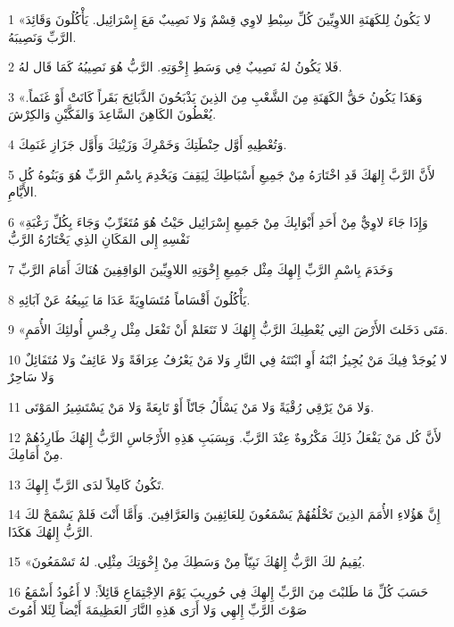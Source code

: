 \par 1 «لا يَكُونُ لِلكَهَنَةِ اللاوِيِّينَ كُلِّ سِبْطِ لاوِي قِسْمٌ وَلا نَصِيبٌ مَعَ إِسْرَائِيل. يَأْكُلُونَ وَقَائِدَ الرَّبِّ وَنَصِيبَهُ.
\par 2 فَلا يَكُونُ لهُ نَصِيبٌ فِي وَسَطِ إِخْوَتِهِ. الرَّبُّ هُوَ نَصِيبُهُ كَمَا قَال لهُ.
\par 3 «وَهَذَا يَكُونُ حَقُّ الكَهَنَةِ مِنَ الشَّعْبِ مِنَ الذِينَ يَذْبَحُونَ الذَّبَائِحَ بَقَراً كَانَتْ أَوْ غَنَماً. يُعْطُونَ الكَاهِنَ السَّاعِدَ وَالفَكَّيْنِ وَالكِرْشَ.
\par 4 وَتُعْطِيهِ أَوَّل حِنْطَتِكَ وَخَمْرِكَ وَزَيْتِكَ وَأَوَّل جَزَازِ غَنَمِكَ.
\par 5 لأَنَّ الرَّبَّ إِلهَكَ قَدِ اخْتَارَهُ مِنْ جَمِيعِ أَسْبَاطِكَ لِيَقِفَ وَيَخْدِمَ بِاسْمِ الرَّبِّ هُوَ وَبَنُوهُ كُل الأَيَّامِ.
\par 6 «وَإِذَا جَاءَ لاوِيٌّ مِنْ أَحَدِ أَبْوَابِكَ مِنْ جَمِيعِ إِسْرَائِيل حَيْثُ هُوَ مُتَغَرِّبٌ وَجَاءَ بِكُلِّ رَغْبَةِ نَفْسِهِ إِلى المَكَانِ الذِي يَخْتَارُهُ الرَّبُّ
\par 7 وَخَدَمَ بِاسْمِ الرَّبِّ إِلهِكَ مِثْل جَمِيعِ إِخْوَتِهِ اللاوِيِّينَ الوَاقِفِينَ هُنَاكَ أَمَامَ الرَّبِّ
\par 8 يَأْكُلُونَ أَقْسَاماً مُتَسَاوِيَةً عَدَا مَا يَبِيعُهُ عَنْ آبَائِهِ.
\par 9 «مَتَى دَخَلتَ الأَرْضَ التِي يُعْطِيكَ الرَّبُّ إِلهُكَ لا تَتَعَلمْ أَنْ تَفْعَل مِثْل رِجْسِ أُولئِكَ الأُمَمِ.
\par 10 لا يُوجَدْ فِيكَ مَنْ يُجِيزُ ابْنَهُ أَوِ ابْنَتَهُ فِي النَّارِ وَلا مَنْ يَعْرُفُ عِرَافَةً وَلا عَائِفٌ وَلا مُتَفَائِلٌ وَلا سَاحِرٌ
\par 11 وَلا مَنْ يَرْقِي رُقْيَةً وَلا مَنْ يَسْأَلُ جَانّاً أَوْ تَابِعَةً وَلا مَنْ يَسْتَشِيرُ المَوْتَى.
\par 12 لأَنَّ كُل مَنْ يَفْعَلُ ذَلِكَ مَكْرُوهٌ عِنْدَ الرَّبِّ. وَبِسَبَبِ هَذِهِ الأَرْجَاسِ الرَّبُّ إِلهُكَ طَارِدُهُمْ مِنْ أَمَامِكَ.
\par 13 تَكُونُ كَامِلاً لدَى الرَّبِّ إِلهِكَ.
\par 14 إِنَّ هَؤُلاءِ الأُمَمَ الذِينَ تَخْلُفُهُمْ يَسْمَعُونَ لِلعَائِفِينَ وَالعَرَّافِينَ. وَأَمَّا أَنْتَ فَلمْ يَسْمَحْ لكَ الرَّبُّ إِلهُكَ هَكَذَا.
\par 15 «يُقِيمُ لكَ الرَّبُّ إِلهُكَ نَبِيّاً مِنْ وَسَطِكَ مِنْ إِخْوَتِكَ مِثْلِي. لهُ تَسْمَعُونَ.
\par 16 حَسَبَ كُلِّ مَا طَلبْتَ مِنَ الرَّبِّ إِلهِكَ فِي حُورِيبَ يَوْمَ الاِجْتِمَاعِ قَائِلاً: لا أَعُودُ أَسْمَعُ صَوْتَ الرَّبِّ إِلهِي وَلا أَرَى هَذِهِ النَّارَ العَظِيمَةَ أَيْضاً لِئَلا أَمُوتَ
